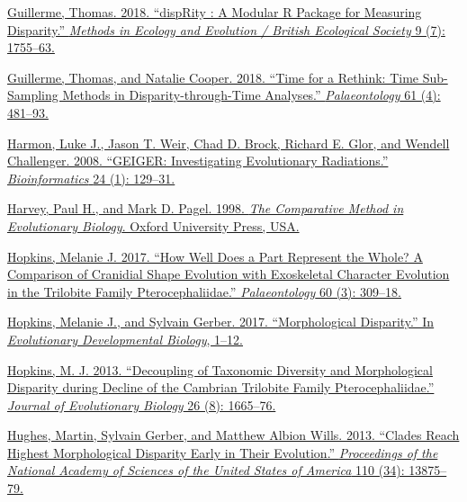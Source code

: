 \href{http://paperpile.com/b/sTGYvp/xDqf}{Guillerme, Thomas. 2018.
``dispRity : A Modular R Package for Measuring Disparity.''
}\href{http://paperpile.com/b/sTGYvp/xDqf}{\emph{Methods in Ecology and
Evolution / British Ecological
Society}}\href{http://paperpile.com/b/sTGYvp/xDqf}{ 9 (7): 1755--63.}

\href{http://paperpile.com/b/sTGYvp/ekU4}{Guillerme, Thomas, and Natalie
Cooper. 2018. ``Time for a Rethink: Time Sub-Sampling Methods in
Disparity-through-Time Analyses.''
}\href{http://paperpile.com/b/sTGYvp/ekU4}{\emph{Palaeontology}}\href{http://paperpile.com/b/sTGYvp/ekU4}{
61 (4): 481--93.}

\href{http://paperpile.com/b/sTGYvp/9Zoi}{Harmon, Luke J., Jason T.
Weir, Chad D. Brock, Richard E. Glor, and Wendell Challenger. 2008.
``GEIGER: Investigating Evolutionary Radiations.''
}\href{http://paperpile.com/b/sTGYvp/9Zoi}{\emph{Bioinformatics
}}\href{http://paperpile.com/b/sTGYvp/9Zoi}{ 24 (1): 129--31.}

\href{http://paperpile.com/b/sTGYvp/WXik}{Harvey, Paul H., and Mark D.
Pagel. 1998. }\href{http://paperpile.com/b/sTGYvp/WXik}{\emph{The
Comparative Method in Evolutionary
Biology}}\href{http://paperpile.com/b/sTGYvp/WXik}{. Oxford University
Press, USA.}

\href{http://paperpile.com/b/sTGYvp/xLdm}{Hopkins, Melanie J. 2017.
``How Well Does a Part Represent the Whole? A Comparison of Cranidial
Shape Evolution with Exoskeletal Character Evolution in the Trilobite
Family Pterocephaliidae.''
}\href{http://paperpile.com/b/sTGYvp/xLdm}{\emph{Palaeontology}}\href{http://paperpile.com/b/sTGYvp/xLdm}{
60 (3): 309--18.}

\href{http://paperpile.com/b/sTGYvp/vTHS}{Hopkins, Melanie J., and
Sylvain Gerber. 2017. ``Morphological Disparity.'' In
}\href{http://paperpile.com/b/sTGYvp/vTHS}{\emph{Evolutionary
Developmental Biology}}\href{http://paperpile.com/b/sTGYvp/vTHS}{,
1--12.}

\href{http://paperpile.com/b/sTGYvp/hea5}{Hopkins, M. J. 2013.
``Decoupling of Taxonomic Diversity and Morphological Disparity during
Decline of the Cambrian Trilobite Family Pterocephaliidae.''
}\href{http://paperpile.com/b/sTGYvp/hea5}{\emph{Journal of Evolutionary
Biology}}\href{http://paperpile.com/b/sTGYvp/hea5}{ 26 (8): 1665--76.}

\href{http://paperpile.com/b/sTGYvp/xxh5}{Hughes, Martin, Sylvain
Gerber, and Matthew Albion Wills. 2013. ``Clades Reach Highest
Morphological Disparity Early in Their Evolution.''
}\href{http://paperpile.com/b/sTGYvp/xxh5}{\emph{Proceedings of the
National Academy of Sciences of the United States of
America}}\href{http://paperpile.com/b/sTGYvp/xxh5}{ 110 (34):
13875--79.}

